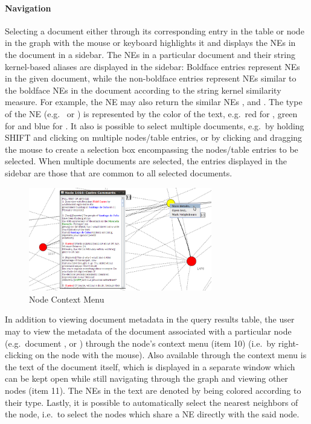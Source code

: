 \paragraph{Navigation}
Selecting a document either through its corresponding entry in the table or node in the graph with the mouse or keyboard highlights it and displays the NEs in the document in a sidebar. The NEs in a particular document and their string kernel-based aliases are displayed in the sidebar: Boldface entries represent NEs in the given document, while the non-boldface entries represent NEs similar to the boldface NEs in the document according to the string kernel similarity measure. For example, the NE \textbf{} may also return the similar NEs ,  and . The type of the NE (e.g.\  or ) is represented by the color of the text, e.g.\ red for , green for  and blue for . It also is possible to select multiple documents, e.g.\ by holding SHIFT and clicking on multiple nodes/table entries, or by clicking and dragging the mouse to create a selection box encompassing the nodes/table entries to be selected. When multiple documents are selected, the entries displayed in the sidebar are those that are common to all selected documents.

\begin{figure}[h]
\centering
\caption{Node Context Menu}
\includegraphics[width=80mm]{nodeclick.png}
\end{figure}

In addition to viewing document metadata in the query results table, the user may to view the metadata of the document associated with a particular node (e.g.\ document ,  or ) through the node's context menu (item 10) (i.e.\ by right-clicking on the node with the mouse). Also available through the context menu is the text of the document itself, which is displayed in a separate window which can be kept open while still navigating through the graph and viewing other nodes (item 11). The NEs in the text are denoted by being colored according to their type. Lastly, it is possible to automatically select the nearest neighbors of the node, i.e.\ to select the nodes which share a NE directly with the said node.

